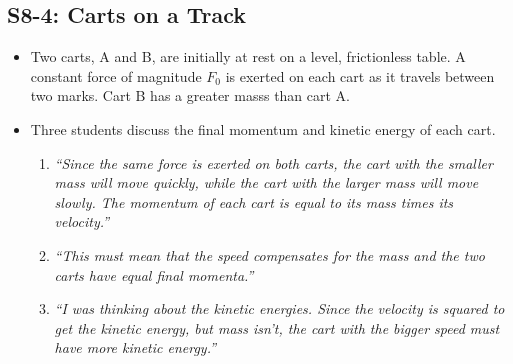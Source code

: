 \documentclass[]{article}
\begin{document}
\begin{PresentSpace}
\vspace{-10pt}
\section*{S8-4: Carts on a Track}
\vspace{-10pt}
\begin{itemize}
	\large
	\item Two carts, A and B, are initially at rest on a level, frictionless table. A constant force of magnitude $F_{0}$ is exerted on each cart as it travels between two marks. Cart B has a greater masss than cart A.
	\begin{center}
	\end{center}
	\item Three students discuss the final momentum and kinetic energy of each cart.
	\begin{enumerate}[(1)]
		\item \textit{``Since the same force is exerted on both carts, the cart with the smaller mass will move quickly, while the cart with the larger mass will move slowly. The momentum of each cart is equal to its mass times its velocity.''}
		\item \textit{``This must mean that the speed compensates for the mass and the two carts have equal final momenta.''}
		\item \textit{``I was thinking about the kinetic energies. Since the velocity is squared to get the kinetic energy, but mass isn't, the cart with the bigger speed must have more kinetic energy.''}
	\end{enumerate}

\end{itemize}
\end{PresentSpace}
\end{document}

